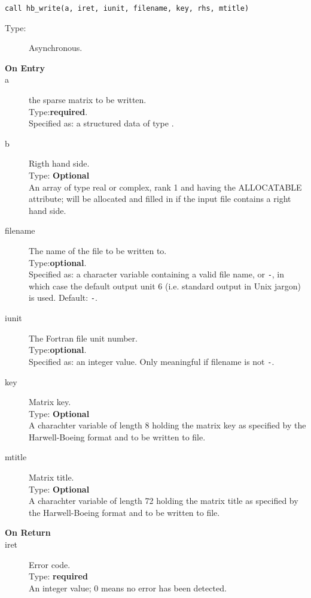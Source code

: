 \clearpage{}

\begin{lstlisting}
call hb_write(a, iret, iunit, filename, key, rhs, mtitle)
\end{lstlisting}



\begin{description}
\item[Type:] Asynchronous.
\item[\bf  On Entry ]
\item[a] the sparse matrix to be written.\\
Type:{\bf required}.\\
Specified as: a structured data of type \spdata.
\item[b] Rigth hand side.\\
Type: {\bf Optional} \\
An  array of type real or complex, rank 1 and having the ALLOCATABLE
attribute; will be allocated and filled in if the input file contains
a right hand side. 
\item[filename] The name of the file to be written to.\\
Type:{\bf optional}.\\
Specified as: a character variable containing a valid file name, or
\verb|-|, in which case the default output unit  6 (i.e. standard output
in Unix jargon) is used. Default: \verb|-|. 
\item[iunit] The Fortran file unit number.\\
Type:{\bf optional}.\\
Specified as: an integer value. Only meaningful if filename is not \verb|-|.
\item[key] Matrix key.\\
Type: {\bf Optional} \\
A charachter variable of length 8 holding the
matrix key as specified by the Harwell-Boeing format and to be
written to file.
\item[mtitle] Matrix title.\\
Type: {\bf Optional} \\
A charachter variable of length 72 holding the
matrix title as specified by the Harwell-Boeing format and to be
written to file.
\end{description}

\begin{description}
\item[\bf On Return]
\item[iret] Error code.\\
Type: {\bf required} \\
An integer value; 0 means no error has been detected. 
\end{description}




